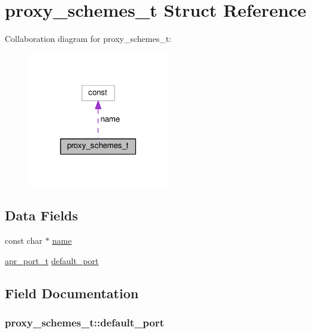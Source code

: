 \hypertarget{structproxy__schemes__t}{}\section{proxy\+\_\+schemes\+\_\+t Struct Reference}
\label{structproxy__schemes__t}


Collaboration diagram for proxy\+\_\+schemes\+\_\+t\+:
\nopagebreak
\begin{figure}[H]
\begin{center}
\leavevmode
\includegraphics[width=174pt]{structproxy__schemes__t__coll__graph}
\end{center}
\end{figure}
\subsection*{Data Fields}
\begin{DoxyCompactItemize}
\item 
const char $\ast$ \hyperlink{structproxy__schemes__t_aabe6c40adfd8db23b65d36d687b76f2b}{name}
\item 
\hyperlink{group__apr__network__io_gaa670a71960f6eb4fe0d0de2a1e7aba03}{apr\+\_\+port\+\_\+t} \hyperlink{structproxy__schemes__t_a5a8c3d9a6458dd3417ab69fa82e7eea1}{default\+\_\+port}
\end{DoxyCompactItemize}


\subsection{Field Documentation}
\subsubsection[{\texorpdfstring{default\+\_\+port}{default_port}}]{ proxy\+\_\+schemes\+\_\+t\+::default\+\_\+port}\hypertarget{structproxy__schemes__t_a5a8c3d9a6458dd3417ab69fa82e7eea1}{}\label{structproxy__schemes__t_a5a8c3d9a6458dd3417ab69fa82e7eea1}
